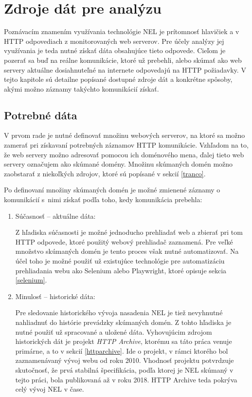 \chapter{Zdroje dát pre analýzu}
\label{data-sources-available-for-research}

Poznávacím znamením využívania technológie NEL je prítomnosť hlavičiek  a  v HTTP odpovediach z monitorovaných web serverov. 
Pre účely analýzy jej využívania je teda nutné získať dáta obsahujúce tieto odpovede.
Cieľom je pozerať sa buď na reálne komunikácie, ktoré už prebehli, alebo skúmať ako web servery aktuálne dosiahnuteľné na internete
odpovedajú na HTTP požiadavky. 
V tejto kapitole sú detailne popísané dostupné zdroje dát a konkrétne spôsoby, akými možno záznamy takýchto komunikácií získať.

\section{Potrebné dáta}

V prvom rade je nutné definovať množinu webových serverov, na ktoré sa možno zamerať pri získavaní potrebných záznamov HTTP komunikácie.
Vzhľadom na to, že web servery možno adresovať pomocou ich doménového mena, ďalej tieto web servery označujem ako skúmané domény.
Množinu skúmaných domén možno zaobstarať z niekoľkých zdrojov, ktoré sú popísané v sekcií \ref{tranco}.

Po definovaní množiny skúmaných domén je možné zmienené záznamy o komunikácií \mbox{s nimi} získať podľa toho, kedy komunikácia prebehla:
\begin{enumerate}
    \item Súčasnosť -- aktuálne dáta:
    
    Z hľadiska súčasnosti je možné jednoducho prehliadať web a zbierať pri tom HTTP odpovede, ktoré použitý webový prehliadač zaznamená. 
    Pre veľké množstvo skúmaných domén je tento proces však nutné automatizovať.
    Na účel toho je možné použiť už existujúce technológie pre automatizáciu prehliadania webu ako Selenium alebo Playwright, ktoré opisuje sekcia \ref{selenium}.

    \item Minulosť -- historické dáta:

    Pre sledovanie historického vývoja nasadenia NEL je tiež nevyhnutné nahliadnuť do histórie prevádzky skúmaných domén. 
    Z tohto hľadiska je nutné použiť už spracované a uložené dáta. 
    Vyhovujúcim zdrojom historických dát je projekt \emph{HTTP Archive}, ktorému sa táto práca venuje primárne, a to v sekcií \ref{httparchive}.
    Ide o projekt, v rámci ktorého bol zaznamenávaný vývoj webu od roku 2010. Vhodnosť projektu potvrdzuje skutočnosť, že prvá stabilná špecifikácia, podľa ktorej je NEL skúmaný v tejto práci, bola publikovaná až v roku 2018. HTTP Archive teda pokrýva celý vývoj NEL v čase.
\end{enumerate}

